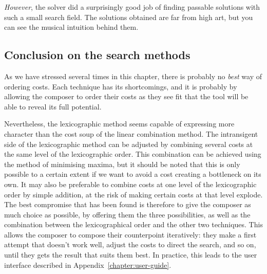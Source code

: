 \textit{However}, the solver did a surprisingly good job of finding passable solutions with such a small search field. The solutions obtained are far from high art, but you can see the musical intuition behind them.

\subsection{Conclusion on the search methods}
As we have stressed several times in this chapter, there is probably no \textit{best} way of ordering costs. Each technique has its shortcomings, and it is probably by allowing the composer to order their costs as they see fit that the tool will be able to reveal its full potential. 

Nevertheless, the lexicographic method seems capable of expressing more character than the cost soup of the linear combination method. The intransigent side of the lexicographic method can be adjusted by combining several costs at the same level of the lexicographic order. This combination can be achieved using the method of minimising maxima, but it should be noted that this is only possible to a certain extent if we want to avoid a cost creating a bottleneck on its own.  It may also be preferable to combine costs at one level of the lexicographic order by simple addition, at the risk of making certain costs at that level explode.
The best compromise that has been found is therefore to give the composer as much choice as possible, by offering them the three possibilities, as well as the combination between the lexicographical order and the other two techniques. This allows the composer to compose their counterpoint iteratively: they make a first attempt that doesn't work well, adjust the costs to direct the search, and so on, until they gets the result that suits them best. In practice, this leads to the user interface described in Appendix~\ref{chapter:user-guide}.
